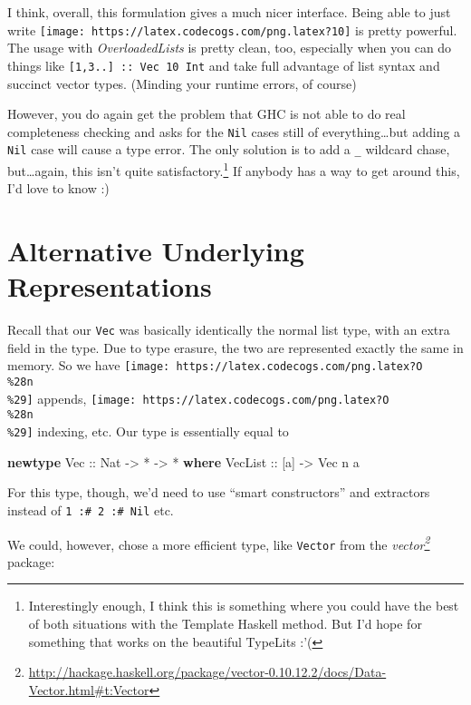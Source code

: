 \documentclass[]{article}
\newenvironment{Shaded}{}{}
\newcommand{\DataTypeTok}[1]{\textcolor[rgb]{0.56,0.13,0.00}{#1}}
\newcommand{\FunctionTok}[1]{\textcolor[rgb]{0.02,0.16,0.49}{#1}}
\newcommand{\KeywordTok}[1]{\textcolor[rgb]{0.00,0.44,0.13}{\textbf{#1}}}
\newcommand{\NormalTok}[1]{#1}
\newcommand{\OtherTok}[1]{\textcolor[rgb]{0.00,0.44,0.13}{#1}}
\renewcommand{\href}[2]{#2\footnote{\url{#1}}}
\begin{document}
I think, overall, this formulation gives a much nicer interface. Being able to
just write \texttt{[image: https://latex.codecogs.com/png.latex?10]} is pretty
powerful. The usage with \emph{OverloadedLists} is pretty clean, too, especially
when you can do things like \texttt{{[}1,3..{]}\ ::\ Vec\ 10\ Int} and take full
advantage of list syntax and succinct vector types. (Minding your runtime
errors, of course)

However, you do again get the problem that GHC is not able to do real
completeness checking and asks for the \texttt{Nil} cases still of
everything\ldots{}but adding a \texttt{Nil} case will cause a type error. The
only solution is to add a \texttt{\_} wildcard chase, but\ldots{}again, this
isn't quite satisfactory.\footnote{Interestingly enough, I think this is
  something where you could have the best of both situations with the Template
  Haskell method. But I'd hope for something that works on the beautiful
  TypeLits :'(} If anybody has a way to get around this, I'd love to know :)

\hypertarget{alternative-underlying-representations}{%
\section{Alternative Underlying
Representations}\label{alternative-underlying-representations}}

Recall that our \texttt{Vec} was basically identically the normal list type,
with an extra field in the type. Due to type erasure, the two are represented
exactly the same in memory. So we have
\texttt{[image: https://latex.codecogs.com/png.latex?O\\\%28n\\\%29]} appends,
\texttt{[image: https://latex.codecogs.com/png.latex?O\\\%28n\\\%29]} indexing, etc.
Our type is essentially equal to

\begin{Shaded}
\begin{Highlighting}[]
\KeywordTok{newtype} \DataTypeTok{Vec}\OtherTok{ ::} \DataTypeTok{Nat} \OtherTok{->} \FunctionTok{*} \OtherTok{->} \FunctionTok{*} \KeywordTok{where}
    \DataTypeTok{VecList}\OtherTok{ ::}\NormalTok{ [a] }\OtherTok{->} \DataTypeTok{Vec}\NormalTok{ n a}
\end{Highlighting}
\end{Shaded}

For this type, though, we'd need to use ``smart constructors'' and extractors
instead of \texttt{1\ :\#\ 2\ :\#\ Nil} etc.

We could, however, chose a more efficient type, like \texttt{Vector} from the
\emph{\href{http://hackage.haskell.org/package/vector-0.10.12.2/docs/Data-Vector.html\#t:Vector}{vector}}
package:
\end{document}
